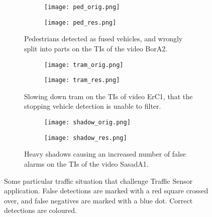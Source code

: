 \begin{figure}[!h]
	\centering
		\begin{subfigure}[b]{0.8\textwidth}
			\centering
			\begin{subfigure}[b]{\textwidth}
				\texttt{[image: ped\_orig.png]}\vspace{3mm}%
			\end{subfigure}
			\begin{subfigure}[b]{\textwidth}
				\texttt{[image: ped\_res.png]}
			\end{subfigure}
		\caption{Pedestrians detected as fused vehicles, and wrongly split into parts on the TIs of the video BorA2. \label{fig:error_peds}}
		\end{subfigure}
		
		\hfill
		
		\begin{subfigure}[b]{0.8\textwidth}
			\centering
			\begin{subfigure}[b]{\textwidth}
				\texttt{[image: tram\_orig.png]}\vspace{3mm}%
			\end{subfigure}
			\begin{subfigure}[b]{\textwidth}
				\texttt{[image: tram\_res.png]}
			\end{subfigure}
			\caption{Slowing down tram on the TIs of video ErC1, that the stopping vehicle detection is unable to filter. \label{fig:error_tram}}
		\end{subfigure}
	
		\hfill
		
		\begin{subfigure}[b]{0.8\textwidth}
			\centering
			\begin{subfigure}[b]{\textwidth}
				\texttt{[image: shadow\_orig.png]}\vspace{3mm}%
			\end{subfigure}
			\begin{subfigure}[b]{\textwidth}
				\texttt{[image: shadow\_res.png]}
			\end{subfigure}
		\caption{Heavy shadows causing an increased number of false alarms on the TIs of the video SasadA1. \label{fig:error_shadows}}
		\end{subfigure}
		
		\caption[Particular traffic situationsthat challenge the system]{Some particular traffic situation that challenge Traffic Sensor application. False detections are marked with a red square crossed over, and false negatives are marked with a blue dot. Correct detections are coloured.\label{fig:errors}}

\end{figure}


